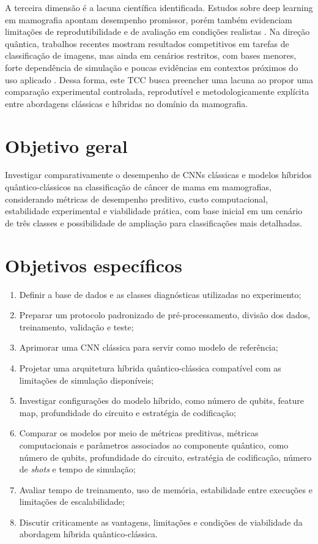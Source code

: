 \documentclass[
    12pt,
    openright,
    oneside,
    a4paper,
    english,
    brazil
]{abntex2}
\begin{document}
A terceira dimensão é a lacuna científica identificada. Estudos sobre deep learning em mamografia apontam desempenho promissor, porém também evidenciam limitações de reprodutibilidade e de avaliação em condições realistas \cite{Bhalla2023MammographyReview}. Na direção quântica, trabalhos recentes mostram resultados competitivos em tarefas de classificação de imagens, mas ainda em cenários restritos, com bases menores, forte dependência de simulação e poucas evidências em contextos próximos do uso aplicado \cite{long2025qcqcnn}. Dessa forma, este TCC busca preencher uma lacuna ao propor uma comparação experimental controlada, reprodutível e metodologicamente explícita entre abordagens clássicas e híbridas no domínio da mamografia.

\section{Objetivo geral}

Investigar comparativamente o desempenho de CNNs clássicas e modelos híbridos quântico-clássicos na classificação de câncer de mama em mamografias, considerando métricas de desempenho preditivo, custo computacional, estabilidade experimental e viabilidade prática, com base inicial em um cenário de três classes e possibilidade de ampliação para classificações mais detalhadas.


\section{Objetivos específicos}

\begin{enumerate} 
    \item Definir a base de dados e as classes diagnósticas utilizadas no experimento;
    \item Preparar um protocolo padronizado de pré-processamento, divisão dos dados, treinamento, validação e teste;
    \item Aprimorar uma CNN clássica para servir como modelo de referência;
    \item Projetar uma arquitetura híbrida quântico-clássica compatível com as limitações de simulação disponíveis;
    \item Investigar configurações do modelo híbrido, como número de qubits, feature map, profundidade do circuito e estratégia de codificação;
    \item Comparar os modelos por meio de métricas preditivas, métricas computacionais e parâmetros associados ao componente quântico, como número de qubits, profundidade do circuito, estratégia de codificação, número de \textit{shots} e tempo de simulação;
    \item Avaliar tempo de treinamento, uso de memória, estabilidade entre execuções e limitações de escalabilidade;
    \item Discutir criticamente as vantagens, limitações e condições de viabilidade da abordagem híbrida quântico-clássica.
\end{enumerate}
\end{document}
